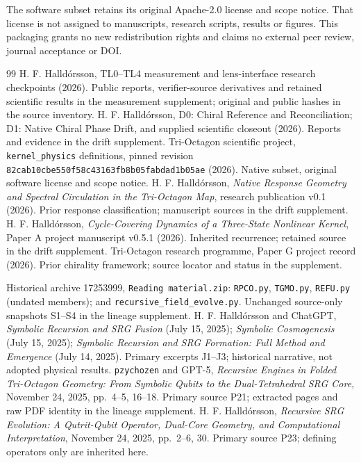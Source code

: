 \documentclass[11pt,a4paper]{article}
\begin{document}
The software subset retains its original Apache-2.0 license and scope notice. That license is not assigned to manuscripts, research scripts, results or figures. This packaging grants no new redistribution rights and claims no external peer review, journal acceptance or DOI.

\begin{thebibliography}{99}
 H. F. Halldórsson, TL0--TL4 measurement and lens-interface research checkpoints (2026). Public reports, verifier-source derivatives and retained scientific results in the measurement supplement; original and public hashes in the source inventory.
 H. F. Halldórsson, D0: Chiral Reference and Reconciliation; D1: Native Chiral Phase Drift, and supplied scientific closeout (2026). Reports and evidence in the drift supplement.
 Tri-Octagon scientific project, \texttt{kernel\_physics} definitions, pinned revision \texttt{82cab10cbe550f58c43163fb8b05fabdad1b05ae} (2026). Native subset, original software license and scope notice.
 H. F. Halldórsson, \emph{Native Response Geometry and Spectral Circulation in the Tri-Octagon Map}, research publication v0.1 (2026). Prior response classification; manuscript sources in the drift supplement.
 H. F. Halldórsson, \emph{Cycle-Covering Dynamics of a Three-State Nonlinear Kernel}, Paper A project manuscript v0.5.1 (2026). Inherited recurrence; retained source in the drift supplement.
 Tri-Octagon research programme, Paper G project record (2026). Prior chirality framework; source locator and status in the supplement.

 Historical archive 17253999, \texttt{Reading material.zip}: \texttt{RPCO.py}, \texttt{TGMO.py}, \texttt{REFU.py} (undated members); and \texttt{recursive\_field\_evolve.py}. Unchanged source-only snapshots S1--S4 in the lineage supplement.
 H. F. Halld\'orsson and ChatGPT, \emph{Symbolic Recursion and SRG Fusion} (July 15, 2025); \emph{Symbolic Cosmogenesis} (July 15, 2025); \emph{Symbolic Recursion and SRG Formation: Full Method and Emergence} (July 14, 2025). Primary excerpts J1--J3; historical narrative, not adopted physical results.
 \texttt{pzychozen} and GPT-5, \emph{Recursive Engines in Folded Tri-Octagon Geometry: From Symbolic Qubits to the Dual-Tetrahedral SRG Core}, November 24, 2025, pp.~4--5, 16--18. Primary source P21; extracted pages and raw PDF identity in the lineage supplement.
 H. F. Halld\'orsson, \emph{Recursive SRG Evolution: A Qutrit-Qubit Operator, Dual-Core Geometry, and Computational Interpretation}, November 24, 2025, pp.~2--6, 30. Primary source P23; defining operators only are inherited here.
\end{thebibliography}
\end{document}
